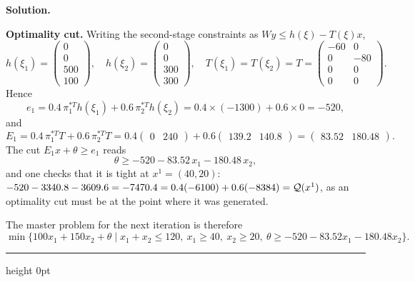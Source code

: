 \documentclass[11pt]{article}
\newenvironment{solution}
    {\par\nobreak\smallskip\noindent\textbf{Solution.}\par\nobreak\smallskip}
    {\par\medskip\hrule height 0pt\medskip}
\begin{document}
\begin{solution}
\textbf{Optimality cut.} Writing the second-stage constraints as
$Wy \leq h(\xi) - T(\xi)x$,
\[
h(\xi_1) = \begin{pmatrix} 0 \\ 0 \\ 500 \\ 100 \end{pmatrix}, \quad
h(\xi_2) = \begin{pmatrix} 0 \\ 0 \\ 300 \\ 300 \end{pmatrix}, \quad
T(\xi_1) = T(\xi_2) = T = \begin{pmatrix} -60 & 0 \\ 0 & -80 \\ 0 & 0 \\ 0 & 0 \end{pmatrix}.
\]
Hence
\[
e_1 = 0.4\,\pi_1^{*T}h(\xi_1) + 0.6\,\pi_2^{*T}h(\xi_2)
= 0.4 \times (-1300) + 0.6 \times 0 = -520,
\]
and
\[
E_1 = 0.4\,\pi_1^{*T}T + 0.6\,\pi_2^{*T}T
= 0.4\begin{pmatrix} 0 & 240 \end{pmatrix} + 0.6\begin{pmatrix} 139.2 & 140.8 \end{pmatrix}
= \begin{pmatrix} 83.52 & 180.48 \end{pmatrix}.
\]
The cut $E_1x + \theta \geq e_1$ reads
\[
\theta \geq -520 - 83.52\,x_1 - 180.48\,x_2 ,
\]
and one checks that it is tight at $x^1 = (40,20)$:
$-520 - 3340.8 - 3609.6 = -7470.4 = 0.4(-6100) + 0.6(-8384) = {\mathcal{Q}}(x^1)$,
as an optimality cut must be at the point where it was generated.

The master problem for the next iteration is therefore
\[
\min \lbrace 100x_1 + 150x_2 + \theta \mid x_1 + x_2 \leq 120,\ x_1 \geq 40,\ x_2 \geq 20,\
\theta \geq -520 - 83.52x_1 - 180.48x_2 \rbrace .
\]
\end{solution}
\end{document}
